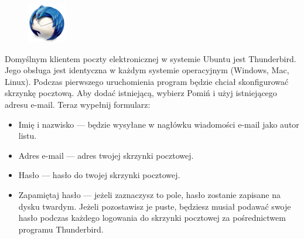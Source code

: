 \begin{figure}
	\vspace{-10pt}
	\includegraphics[width=\linewidth]{images/ikony_thunderbird.png}
\end{figure}

Domyślnym klientem poczty elektronicznej w systemie Ubuntu jest Thunderbird. Jego obsługa jest identyczna w każdym systemie operacyjnym (Windows, Mac, Linux). Podczas pierwszego uruchomienia program będzie chciał skonfigurować skrzynkę pocztową. Aby dodać istniejącą, wybierz \textcolor{ubuntu_orange}{Pomiń i użyj istniejącego adresu e-mail}. Teraz wypełnij formularz:
\begin{itemize}
\item \textcolor{ubuntu_orange}{Imię i nazwisko} --- będzie wysyłane w nagłówku wiadomości e-mail jako autor listu.
\item \textcolor{ubuntu_orange}{Adres e-mail} --- adres twojej skrzynki pocztowej.
\item \textcolor{ubuntu_orange}{Hasło} --- hasło do twojej skrzynki pocztowej.
\item \textcolor{ubuntu_orange}{Zapamiętaj hasło} --- jeżeli zaznaczysz to pole, hasło zostanie zapisane na dysku twardym. Jeżeli pozostawisz je puste, będziesz musiał podawać swoje hasło podczas każdego logowania do skrzynki pocztowej za pośrednictwem programu Thunderbird.
\end{itemize}

